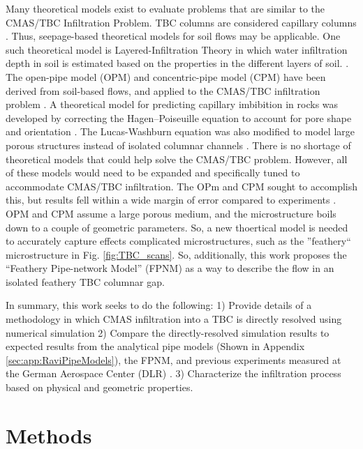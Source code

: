 \documentclass[%
 aip,
 amsmath,amssymb,
 reprint,%
floatfix]{revtex4-1}
\begin{document}
Many theoretical models exist to evaluate problems that are similar to the CMAS/TBC Infiltration Problem. TBC columns are considered capillary columns \cite{Naraparaju2017}. Thus, seepage-based theoretical models for soil flows may be applicable. One such theoretical model is Layered-Infiltration Theory in which water infiltration depth in soil is estimated based on the properties in the different layers of soil. \cite{ZHAO2024100028}. The open-pipe model (OPM) and concentric-pipe model (CPM) have been derived from soil-based flows, and applied to the CMAS/TBC infiltration problem \cite{CARMAN1997S32, Chapuis2003616, Naraparaju2019}. A theoretical model for predicting capillary imbibition in rocks was developed by correcting the Hagen–Poiseuille equation to account for pore shape and orientation \cite{Benavente2002}. The Lucas-Washburn equation was also modified to model large porous structures instead of isolated columnar channels \cite{Cai2021}. There is no shortage of theoretical models that could help solve the CMAS/TBC problem. However, all of these models would need to be expanded and specifically tuned to accommodate CMAS/TBC infiltration. The OPm and CPM sought to accomplish this, but results fell within a wide margin of error compared to experiments \cite{Naraparaju2019}. OPM and CPM assume a large porous medium, and the microstructure boils down to a couple of geometric parameters. So, a new thoertical model is needed to accurately capture effects complicated microstructures, such as the ''feathery`` microstructure in Fig. \ref{fig:TBC_scans}. So, additionally, this work proposes the ``Feathery Pipe-network Model'' (FPNM) as a way to describe the flow in an isolated feathery TBC columnar gap. 



In summary, this work seeks to do the following: 1) Provide details of a methodology in which CMAS infiltration into a TBC is directly resolved using numerical simulation 2) Compare the directly-resolved simulation results to expected results from the analytical pipe models \cite{Naraparaju2019} (Shown in Appendix \ref{sec:app:RaviPipeModels}), the FPNM, and previous experiments measured at the German Aerospace Center (DLR) \cite{Naraparaju2019}. 3) Characterize the infiltration process based on physical and geometric properties.

\section{Methods}
\label{sec:methods}
\end{document}
